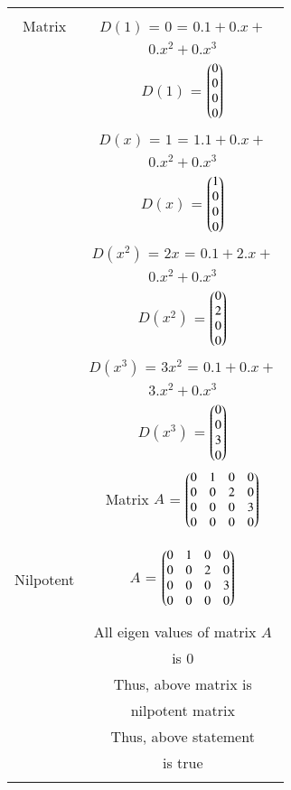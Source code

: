 \documentclass[journal,12pt,twocolumn]{IEEEtran}
\begin{document}
\begin{table}[h!]
\begin{center}
\begin{tabular}{|c|c|}
\hline
&\\
Matrix & $D(1)$ = $0$ = $0.1+0.x+$\\
& $0.x^2+0.x^3$\\
& $D(1)$ = $\begin{pmatrix}0\\0\\0\\0\end{pmatrix}$ \\
& $D(x)$ = $1$ = $1.1+0.x+$\\
& $0.x^2+0.x^3$\\
& $D(x)$ = $\begin{pmatrix}1\\0\\0\\0\end{pmatrix}$ \\
& $D(x^2)$ = $2x$ = $0.1+2.x+$\\
& $0.x^2+0.x^3$\\
& $D(x^2)$ = $\begin{pmatrix}0\\2\\0\\0\end{pmatrix}$ \\
& $D(x^3)$ = $3x^2$ = $0.1+0.x+$\\
& $3.x^2+0.x^3$\\
& $D(x^3)$ = $\begin{pmatrix}0\\0\\3\\0\end{pmatrix}$ \\
& Matrix $A$ = $\begin{pmatrix}0&1&0&0\\
                0&0&2&0\\
                0&0&0&3\\
                0&0&0&0\end{pmatrix}$\\
&\\
\hline
& \\
Nilpotent & $A$ = $\begin{pmatrix}0&1&0&0\\
                0&0&2&0\\
                0&0&0&3\\
                0&0&0&0\end{pmatrix}$\\
& \\
& All eigen values of matrix $A$\\
& is $0$\\
& Thus, above matrix is \\
& nilpotent matrix \\
& Thus, above statement \\
& is true\\
& \\
\hline
\end{tabular}
\end{center}
\end{table}
\end{document}
